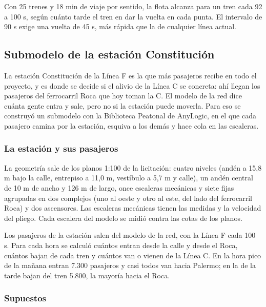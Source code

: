 \documentclass{article}
\begin{document}
Con 25 trenes y 18 min de viaje por sentido, la flota alcanza para un tren cada 92 a 100 s, según cuánto
tarde el tren en dar la vuelta en cada punta. El intervalo de 90 s exige una vuelta de 45 s, más rápida que
la de cualquier línea actual.

\subsection{Submodelo de la estación Constitución}
\label{sec:peatonal}

La estación Constitución de la Línea F es la que más pasajeros recibe en todo el proyecto, y es donde se
decide si el alivio de la Línea C se concreta: ahí llegan los pasajeros del ferrocarril Roca que hoy toman la
C. El modelo de la red dice cuánta gente entra y sale, pero no si la estación puede moverla. Para eso se
construyó un submodelo con la Biblioteca Peatonal de AnyLogic, en el que cada pasajero camina por la estación,
esquiva a los demás y hace cola en las escaleras.

\subsubsection{La estación y sus pasajeros}

La geometría sale de los planos 1:100 de la licitación: cuatro niveles (andén a 15,8 m bajo la calle,
entrepiso a 11,0 m, vestíbulo a 5,7 m y calle), un andén central de 10 m de ancho y 126 m de largo, once
escaleras mecánicas y siete fijas agrupadas en dos complejos (uno al oeste y otro al este, del lado del
ferrocarril Roca) y dos ascensores. Las escaleras mecánicas tienen las medidas y la velocidad del pliego. Cada
escalera del modelo se midió contra las cotas de los planos.

Los pasajeros de la estación salen del modelo de la red, con la Línea F cada 100 s. Para cada hora se calculó
cuántos entran desde la calle y desde el Roca, cuántos bajan de cada tren y cuántos van o vienen de la Línea
C. En la hora pico de la mañana entran 7.300 pasajeros y casi todos van hacia Palermo; en la de la tarde bajan
del tren 5.800, la mayoría hacia el Roca.

\subsubsection{Supuestos}
\end{document}
